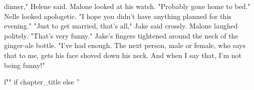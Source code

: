 \documentclass{novel}
\begin{document}
dinner," Helene said. Malone looked at his watch. "Probably gone home to bed." Nelle looked apologetic. "I hope you didn't have anything planned for this evening." "Just to get married, that's all," Jake said crossly. Malone laughed politely. "That's very funny." Jake's fingers tightened around the neck of the ginger-ale bottle. "I've had enough. The next person, male or female, who says that to me, gets his face shoved down his neck. And when I say that, I'm not being funny!"

\begin{ChapterStart}
\vspace{3\nbs}
f"" if chapter_title else ''
\end{ChapterStart}
\end{document}
